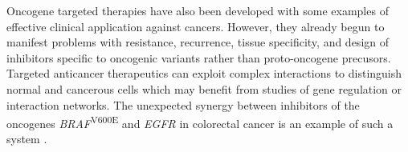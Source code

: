 
Oncogene targeted therapies have also been developed with some examples of effective clinical application against cancers. However, they already begun to manifest problems with resistance, recurrence, tissue specificity, and design of inhibitors specific to oncogenic variants rather than proto-oncogene precusors. Targeted anticancer therapeutics can exploit complex interactions to distinguish normal and cancerous cells which may benefit from studies of gene regulation or interaction networks. The unexpected synergy between inhibitors of the oncogenes \textit{BRAF}\textsuperscript{V600E} and \textit{EGFR} in colorectal cancer is an example of such a system \citet{Prahallad2012}.



